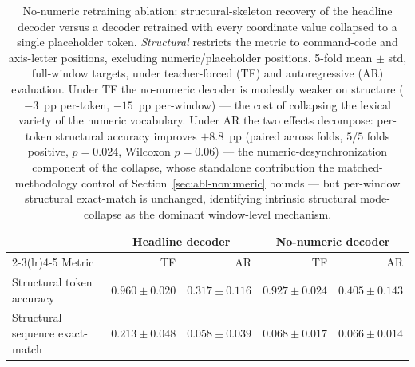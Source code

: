 \begin{table}[H]
\centering
\caption{No-numeric retraining ablation: structural-skeleton recovery of the
headline decoder versus a decoder retrained with every coordinate value
collapsed to a single placeholder token. \emph{Structural} restricts the
metric to command-code and axis-letter positions, excluding
numeric/placeholder positions. 5-fold mean $\pm$ std, full-window targets,
under teacher-forced (TF) and autoregressive (AR) evaluation. Under TF the
no-numeric decoder is modestly weaker on structure ($-3$~pp per-token,
$-15$~pp per-window) --- the cost of collapsing the lexical variety of the
numeric vocabulary. Under AR the two effects decompose: per-token structural
accuracy improves $+8.8$~pp (paired across folds, $5/5$ folds positive,
$p\!=\!0.024$, Wilcoxon $p\!=\!0.06$) --- the numeric-desynchronization component of the
collapse, whose standalone contribution the matched-methodology control of
Section~\ref{sec:abl-nonumeric} bounds --- but per-window structural exact-match is unchanged, identifying
intrinsic structural mode-collapse as the dominant window-level mechanism.}
\label{tab:nonumeric}
\begin{tabular}{l r r r r}
\toprule
 & \multicolumn{2}{c}{Headline decoder} & \multicolumn{2}{c}{No-numeric decoder} \\
\cmidrule(lr){2-3}\cmidrule(lr){4-5}
Metric & TF & AR & TF & AR \\
\midrule
Structural token accuracy      & $0.960 \pm 0.020$ & $0.317 \pm 0.116$ & $0.927 \pm 0.024$ & $0.405 \pm 0.143$ \\
Structural sequence exact-match & $0.213 \pm 0.048$ & $0.058 \pm 0.039$ & $0.068 \pm 0.017$ & $0.066 \pm 0.014$ \\
\bottomrule
\end{tabular}
\end{table}
